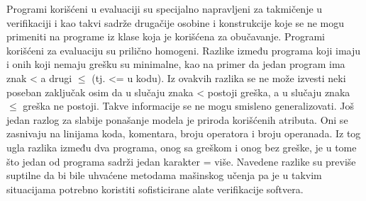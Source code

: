 \documentclass[12pt,oneside]{memoir}
\begin{document}
Programi korišćeni u evaluaciji su specijalno napravljeni za takmičenje u verifikaciji i kao takvi sadrže drugačije osobine i konstrukcije koje se ne mogu primeniti na programe iz klase koja je korišćena za obučavanje. Programi korišćeni za evaluaciju su prilično homogeni. Razlike između programa koji imaju i onih koji nemaju grešku su minimalne, kao na primer da jedan program ima znak < a drugi $\leq$ (tj. <= u kodu). Iz ovakvih razlika se ne može izvesti neki poseban zaključak osim da u slučaju znaka < postoji greška, a u slučaju znaka $\leq$ greška ne postoji. Takve informacije se ne mogu smisleno generalizovati. Još jedan razlog za slabije ponašanje modela je priroda korišćenih atributa. Oni se zasnivaju na linijama koda, komentara, broju operatora i broju operanada. Iz tog ugla razlika između dva programa, onog sa greškom i onog bez greške, je u tome što jedan od programa sadrži jedan karakter = više. Navedene razlike su previše suptilne da bi bile uhvaćene metodama mašinskog učenja pa je u takvim situacijama potrebno koristiti sofisticirane alate verifikacije softvera.







\end{document}
